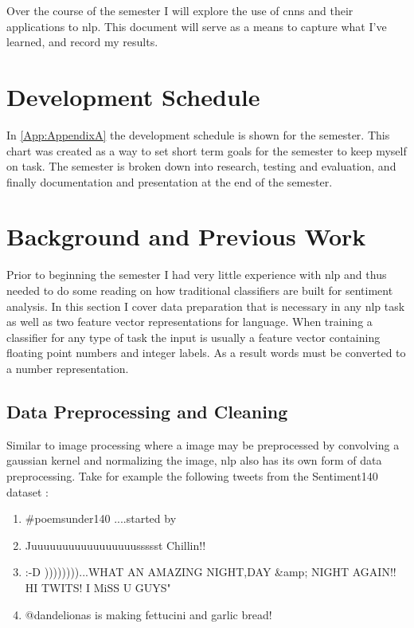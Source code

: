\documentclass[12pt]{article}
\begin{document}
Over the course of the semester I will explore the use of \ac{cnn}s and their applications to \ac{nlp}. This document will serve as a means to capture what I've learned, and record my results. 

\section{Development Schedule}

In \cref{App:AppendixA} the development schedule is shown for the semester. This chart was created as a way to set short term goals for the semester to keep myself on task. The semester is broken down into research, testing and evaluation, and finally documentation and presentation at the end of the semester. 


\section {Background and Previous Work}
Prior to beginning the semester I had very little experience with \ac{nlp} and thus needed to do some reading on how traditional classifiers are built for sentiment analysis. In this section I cover data preparation that is necessary in any \ac{nlp} task as well as two feature vector representations for language. When training a classifier for any type of task the input is usually a feature vector containing floating point numbers and integer labels. As a result words must be converted to a number representation. 

\subsection {Data Preprocessing and Cleaning}
Similar to image processing where a image may be preprocessed by convolving a gaussian kernel and normalizing the image, \ac{nlp} also has its own form of data preprocessing. Take for example the following tweets from the Sentiment140 dataset \cite{sentiment140}:

\begin{enumerate}
	\item \#poemsunder140 ....started by 
	\item Juuuuuuuuuuuuuuuuussssst Chillin!!
	\item :-D ))))))))...WHAT AN AMAZING NIGHT,DAY \&amp; NIGHT AGAIN!! HI TWITS! I MiSS U GUYS"
	\item @dandelionas is making fettucini and garlic bread!
\end{enumerate} 
\end{document}
